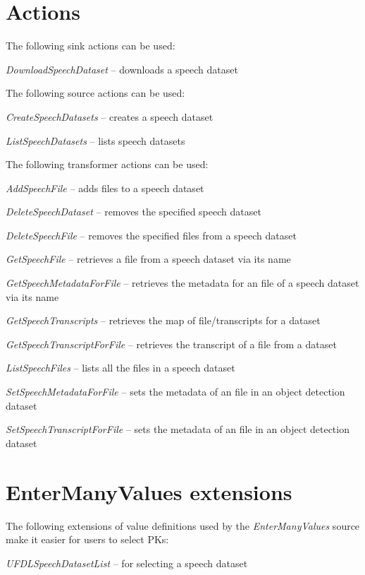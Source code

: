 \documentclass[a4paper]{book}
\begin{document}
\section{Actions}
The following sink actions can be used:
\begin{tight_itemize}
  \item \textit{DownloadSpeechDataset} -- downloads a speech dataset
\end{tight_itemize}
The following source actions can be used:
\begin{tight_itemize}
  \item \textit{CreateSpeechDatasets} -- creates a speech dataset
  \item \textit{ListSpeechDatasets} -- lists speech datasets
\end{tight_itemize}
The following transformer actions can be used:
\begin{tight_itemize}
  \item \textit{AddSpeechFile} -- adds files to a speech dataset
  \item \textit{DeleteSpeechDataset} -- removes the specified speech dataset
  \item \textit{DeleteSpeechFile} -- removes the specified files from a speech dataset
  \item \textit{GetSpeechFile} -- retrieves a file from a speech dataset via its name
  \item \textit{GetSpeechMetadataForFile} -- retrieves the metadata for an file of a speech dataset via its name
  \item \textit{GetSpeechTranscripts} -- retrieves the map of file/transcripts for a dataset
  \item \textit{GetSpeechTranscriptForFile} -- retrieves the transcript of a file from a dataset
  \item \textit{ListSpeechFiles} -- lists all the files in a speech dataset
  \item \textit{SetSpeechMetadataForFile} -- sets the metadata of an file in an object detection dataset
  \item \textit{SetSpeechTranscriptForFile} -- sets the metadata of an file in an object detection dataset
\end{tight_itemize}

\section{EnterManyValues extensions}
The following extensions of value definitions used by the \textit{EnterManyValues}
source make it easier for users to select PKs:
\begin{tight_itemize}
  \item \textit{UFDLSpeechDatasetList} -- for selecting a speech dataset
\end{tight_itemize}


\end{document}
